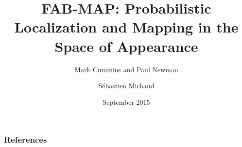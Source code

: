\documentclass[14pt,t]{beamer}
\title[FAB-MAP]{FAB-MAP: Probabilistic Localization and Mapping in the Space of Appearance}
\subtitle{Mark Cummins and Paul Newman}
\author{Sébastien Michaud}
\institute{Laval University}
\date{September 2015}
\begin{document}
\begin{frame}
    \titlepage
\end{frame}



\begin{frame}[allowframebreaks]
    \frametitle{References}
    \def\newblock{\hskip .11em plus .33em minus .07em} %
    \small
    \nocite{*}
    
    
\end{frame}
\end{document}
